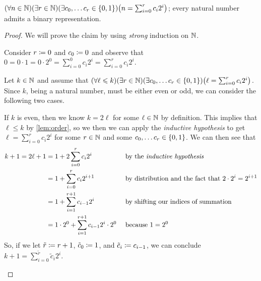\begin{example}
    $\pn*{\forall n \in \N}\pn*{\exists r \in \N}\pn*{\exists c_0, \dots c_r \in \set*{0, 1}}\pn*{n = \sum_{i = 0}^{r}c_i 2^i}$;
    \ie every natural number admits a binary representation.
\end{example}
\begin{proof}
    We will prove the claim by using \emph{strong} induction on $\mathbb{N}$.
    \begin{case}
        Consider $r \coloneqq 0$ and $c_0 \coloneqq 0$ and observe that
        $0 = 0 \cdot 1 = 0 \cdot 2^{0} = \sum_{i = 0}^{0}c_i 2^i = \sum_{i = 0}^{r}c_i 2^i$.
    \end{case}
    \begin{case}
        Let $k \in \mathbb{N}$ and assume that
        $\pn*{\forall \ell \leq k}\pn*{\exists r \in \N}\pn*{\exists c_0, \dots c_r \in \set*{0, 1}}
        \pn*{\ell = \sum_{i = 0}^{r}c_i 2^i}$.
        Since $k$, being a natural number, must be either even or odd, we can consider the following two cases.
        \begin{case}[Case 1]
            If $k$ is even, then we know $k = 2 \ell$ for some $\ell \in \mathbb{N}$ by definition.
            This implies that $\ell \leq k$ by \autoref{lem:order},
            so we then we can apply the \emph{inductive hypothesis} to get $\ell = \sum_{i = 0}^{r}c_i 2^i$
            for some $r \in \mathbb{N}$ and some $c_0, \dots c_r \in \set*{0, 1}$.
            We can then see that
            \begin{alignat*}{2}
                k + 1 = 2\ell + 1
                      &= 1 + 2 \sum_{i = 0}^{r}c_i 2^i &&\text{ by the \emph{inductive hypothesis}}\\
                      &= 1 + \sum_{i = 0}^{r}c_i 2^{i + 1} &&\text{ by distribution and the fact that } 2 \cdot 2^i = 2^{i + 1}\\
                      &= 1 + \sum_{i = 1}^{r + 1}c_{i - 1} 2^i &&\text{ by shifting our indices of summation}\\
                      &= 1 \cdot 2^0 + \sum_{i = 1}^{r + 1}c_{i - 1} 2^i \cdot 2^0 &&\text{ because } 1 = 2^0
            \end{alignat*}
            So, if we let $\tilde{r} \coloneqq r + 1$, $\tilde{c}_0 \coloneqq 1$, and $\tilde{c}_i \coloneqq c_{i - 1}$,
            we can conclude $k + 1 = \sum_{i = 0}^{\tilde{r}}\tilde{c}_i 2^i$.
        \end{case}

\end{case}
\end{proof}
